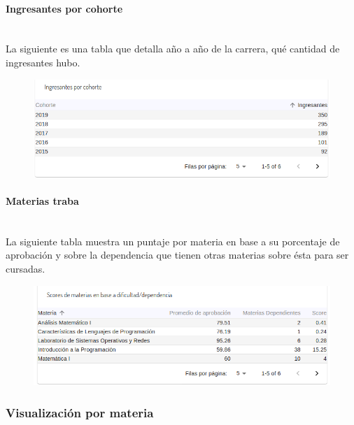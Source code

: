 \paragraph{Ingresantes por cohorte} \mbox{}\\
La siguiente es una tabla que detalla año a año de la carrera, qué cantidad de ingresantes hubo.

\begin{figure}[!htbp]
  \centering
    \includegraphics[scale=0.4]{images/seguimiento-academico/sa-ingresantes-cohorte.png}
  \label{fig:sa-ingresantes-cohorte}
\end{figure}

\paragraph{Materias traba} \mbox{}\\
La siguiente tabla muestra un puntaje por materia en base a su porcentaje de aprobación y sobre la dependencia que tienen otras materias sobre ésta para ser cursadas.

\begin{figure}[!htbp]
  \centering
    \includegraphics[scale=0.4]{images/seguimiento-academico/sa-materias-traba.png}
  \label{fig:sa-materias-traba}
\end{figure}


\subsubsection{Visualización por materia}

